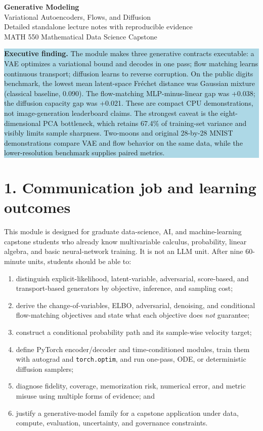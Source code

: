 \documentclass[11pt]{article}
\newcommand{\code}[1]{\texttt{#1}}
\begin{document}
\begin{center}
{\LARGE\bfseries\color{navy} Generative Modeling}\\[4pt]
{\Large Variational Autoencoders, Flows, and Diffusion}\\[9pt]
{\large Detailed standalone lecture notes with reproducible evidence}\\[10pt]
MATH 550 Mathematical Data Science Capstone\\
\end{center}

\colorbox{lightblue}{\parbox{0.96\linewidth}{
\textbf{Executive finding.} The module makes three generative contracts
executable: a VAE optimizes a variational bound and decodes in one pass; flow
matching learns continuous transport; diffusion learns to reverse corruption. On the
public digits benchmark, the lowest mean latent-space Fr\'echet distance was
Gaussian mixture (classical baseline,
0.090). The flow-matching MLP-minus-linear
gap was +0.038; the diffusion capacity gap was
+0.021.
These are compact CPU demonstrations, not image-generation leaderboard claims.
The strongest caveat is the eight-dimensional PCA bottleneck, which retains
67.4\% of training-set variance and visibly limits sample sharpness.
Two-moons and original 28-by-28 MNIST demonstrations compare VAE and flow behavior
on the same data, while the lower-resolution benchmark supplies paired metrics.
}}

\section*{1. Communication job and learning outcomes}

This module is designed for graduate data-science, AI, and machine-learning
capstone students who already know multivariable calculus, probability,
linear algebra, and basic neural-network training. It is not an LLM unit.
After nine 60-minute units, students should be able to:

\begin{enumerate}
\item distinguish explicit-likelihood, latent-variable, adversarial, score-based,
and transport-based generators by objective, inference, and sampling cost;
\item derive the change-of-variables, ELBO, adversarial, denoising, and conditional
flow-matching objectives and state what each objective does \emph{not} guarantee;
\item construct a conditional probability path and its sample-wise velocity target;
\item define PyTorch encoder/decoder and time-conditioned modules, train them with
autograd and \code{torch.optim}, and run one-pass, ODE, or deterministic diffusion samplers;
\item diagnose fidelity, coverage, memorization risk, numerical error, and metric
misuse using multiple forms of evidence; and
\item justify a generative-model family for a capstone application under data,
compute, evaluation, uncertainty, and governance constraints.
\end{enumerate}
\end{document}
